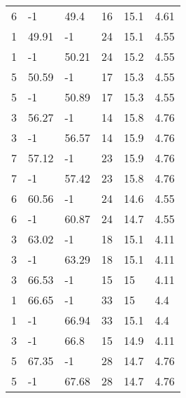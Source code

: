 \begin{table*}[h!]
\begin{tabular*}{\linewidth}{p{50pt}<{\centering}p{50pt}<{\centering}
    p{60pt}<{\centering}p{60pt}<{\centering}p{60pt}<{\centering}p{70pt}<{\centering}}
    6 & -1 & 49.4 & 16 & 15.1 & 4.61 \\
    1 & 49.91 & -1 & 24 & 15.1 & 4.55 \\
    1 & -1 & 50.21 & 24 & 15.2 & 4.55 \\
    5 & 50.59 & -1 & 17 & 15.3 & 4.55 \\
    5 & -1 & 50.89 & 17 & 15.3 & 4.55 \\
    3 & 56.27 & -1 & 14 & 15.8 & 4.76 \\
    3 & -1 & 56.57 & 14 & 15.9 & 4.76 \\
    7 & 57.12 & -1 & 23 & 15.9 & 4.76 \\
    7 & -1 & 57.42 & 23 & 15.8 & 4.76 \\
    6 & 60.56 & -1 & 24 & 14.6 & 4.55 \\
    6 & -1 & 60.87 & 24 & 14.7 & 4.55 \\
    3 & 63.02 & -1 & 18 & 15.1 & 4.11 \\
    3 & -1 & 63.29 & 18 & 15.1 & 4.11 \\
    3 & 66.53 & -1 & 15 & 15 & 4.11 \\
    1 & 66.65 & -1 & 33 & 15 & 4.4 \\
    1 & -1 & 66.94 & 33 & 15.1 & 4.4 \\
    3 & -1 & 66.8 & 15 & 14.9 & 4.11 \\
    5 & 67.35 & -1 & 28 & 14.7 & 4.76 \\
    5 & -1 & 67.68 & 28 & 14.7 & 4.76 \\
    \bottomrule
  \end{tabular*}
  \label{Ap3}
\end{table*}

\newpage

